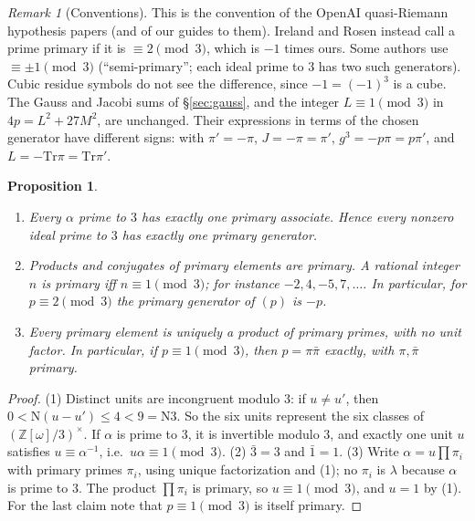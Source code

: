 \documentclass[11pt]{article}
\numberwithin{equation}{section}
\newcommand{\N}{\mathrm N}
\newcommand{\Tr}{\mathrm{Tr}}
\newcommand{\OO}{\mathbb Z[\omega]}
\newtheorem{proposition}[theorem]{Proposition}
\theoremstyle{definition}
\theoremstyle{remark}
\newtheorem{remark}[theorem]{Remark}
\begin{document}
\begin{remark}[Conventions]
This is the convention of the OpenAI quasi-Riemann hypothesis papers \cite{OAI} (and of our
guides to them). Ireland and Rosen \cite[Ch.~9]{IR} instead call a prime primary if it is
$\equiv2\pmod3$, which is $-1$ times ours. Some authors use $\equiv\pm1\pmod 3$
(``semi-primary''; each ideal prime to $3$ has two such generators). Cubic residue symbols
do not see the difference, since $-1=(-1)^3$ is a cube. The Gauss and Jacobi sums of
\S\ref{sec:gauss}, and the integer $L\equiv1\pmod3$ in $4p=L^2+27M^2$, are unchanged.
Their expressions in terms of the chosen generator have different signs: with $\pi'=-\pi$,
$J=-\pi=\pi'$, $g^3=-p\pi=p\pi'$, and $L=-\Tr\pi=\Tr\pi'$.
\end{remark}

\begin{proposition}\label{prop:primary}
\begin{enumerate}
\item Every $\alpha$ prime to $3$ has exactly one primary associate. Hence every nonzero
ideal prime to $3$ has exactly one primary generator.
\item Products and conjugates of primary elements are primary. A rational integer $n$ is
primary iff $n\equiv1\pmod 3$; for instance $-2,4,-5,7,\dots$. In particular, for
$p\equiv2\pmod 3$ the primary generator of $(p)$ is $-p$.
\item Every primary element is uniquely a product of primary primes, \emph{with no unit
factor}. In particular, if $p\equiv1\pmod3$, then $p=\pi\bar\pi$ exactly, with $\pi,\bar\pi$ primary.
\end{enumerate}
\end{proposition}
\begin{proof}
(1) Distinct units are incongruent modulo $3$: if $u\ne u'$, then $0<\N(u-u')\le4<9=\N3$. So the
six units represent the six classes of $(\OO/3)^\times$. If $\alpha$ is prime to $3$, it is
invertible modulo $3$, and exactly one unit $u$ satisfies $u\equiv\alpha^{-1}$, i.e.\
$u\alpha\equiv1\pmod 3$. (2) $\bar 3=3$ and $\bar1=1$. (3) Write $\alpha=u\prod\pi_i$ with primary primes
$\pi_i$, using unique factorization and (1); no $\pi_i$ is $\lambda$ because $\alpha$ is prime to $3$.
The product $\prod\pi_i$ is primary, so $u\equiv1\pmod 3$, and $u=1$ by (1). For the last claim
note that $p\equiv1\pmod 3$ is itself primary.
\end{proof}
\end{document}
